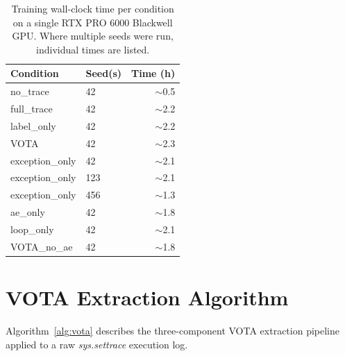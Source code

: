 \begin{table}[h!]
\centering
\caption{Training wall-clock time per condition on a single RTX PRO 6000 Blackwell GPU. Where multiple seeds were run, individual times are listed.}
\label{tab:train_time}
\small
\begin{tabular}{llr}
\toprule
\textbf{Condition} & \textbf{Seed(s)} & \textbf{Time (h)} \\
\midrule
no\_trace       & 42         & ${\sim}$0.5 \\
full\_trace     & 42         & ${\sim}$2.2 \\
label\_only     & 42         & ${\sim}$2.2 \\
VOTA                     & 42         & ${\sim}$2.3 \\
exception\_only & 42         & ${\sim}$2.1 \\
exception\_only & 123        & ${\sim}$2.1 \\
exception\_only & 456        & ${\sim}$1.3 \\
ae\_only        & 42         & ${\sim}$1.8 \\
loop\_only      & 42         & ${\sim}$2.1 \\
VOTA\_no\_ae    & 42         & ${\sim}$1.8 \\
\bottomrule
\end{tabular}
\end{table}

\section{VOTA Extraction Algorithm}
\label{sec:vota_algorithm}

Algorithm~\ref{alg:vota} describes the three-component VOTA extraction pipeline applied to a raw \textit{sys.settrace} execution log.

